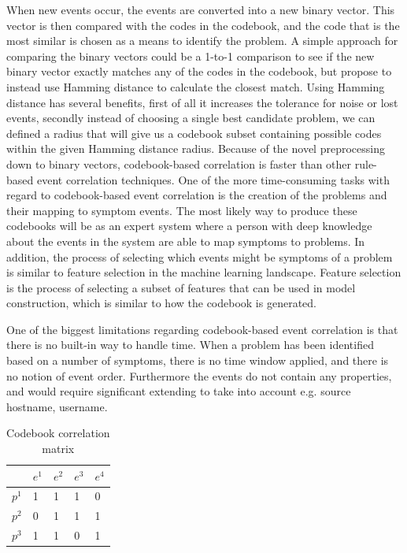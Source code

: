 When new events occur, the events are converted into a new binary vector. This vector is then compared with the codes in the codebook, and the code that is the most similar is chosen as a means to identify the problem. A simple approach for comparing the binary vectors could be a 1-to-1 comparison to see if the new binary vector exactly matches any of the codes in the codebook, but \textcite{yemini_1996} propose to instead use Hamming distance to calculate the closest match. Using Hamming distance has several benefits, first of all it increases the tolerance for noise or lost events, secondly instead of choosing a single best candidate problem, we can defined a radius that will give us a codebook subset containing possible codes within the given Hamming distance radius.
Because of the novel preprocessing down to binary vectors, codebook-based correlation is faster than other rule-based event correlation techniques. One of the more time-consuming tasks with regard to codebook-based event correlation is the creation of the problems and their mapping to symptom events. The most likely way to produce these codebooks will be as an expert system where a person with deep knowledge about the events in the system are able to map symptoms to problems. In addition, the process of selecting which events might be symptoms of a problem is similar to feature selection in the machine learning landscape. Feature selection is the process of selecting a subset of features that can be used in model construction, which is similar to how the codebook is generated.

One of the biggest limitations regarding codebook-based event correlation is that there is no built-in way to handle time. When a problem has been identified based on a number of symptoms, there is no time window applied, and there is no notion of event order. Furthermore the events do not contain any properties, and would require significant extending to take into account e.g. source hostname, username.

\begin{table}[ht]
\centering
\begin{tabular}{l|llll}
 & $e^1$ & $e^2$ & $e^3$ & $e^4$ \\ \hline
$p^1$ & 1 & 1 & 1 & 0 \\
$p^2$ & 0 & 1 & 1 & 1 \\
$p^3$ & 1 & 1 & 0 & 1
\end{tabular}
\caption{Codebook correlation matrix}
\label{tab:correlation-matrix}
\end{table}

